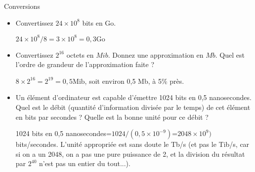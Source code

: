 \begin{exercice}
  \begin{exercicelet}{Conversions}
    \begin{itemize}
    \item Convertissez $24\times 10^8$ bits en $\mathrm{Go}$.
      \begin{correction} $24\times 10^8/8=3\times 10^8=0,3 \mathrm{Go}$
      \end{correction}
    \item Convertissez $2^{16}$ octets en $Mib$. Donnez une approximation en
      $Mb$. Quel est l'ordre de grandeur de l'approximation faite ?
      \begin{correction} $8\times2^{16}=2^{19}=0,5 \mathrm{Mib}$, soit
        environ 0,5 Mb, à 5\% près.
      \end{correction}
    \item Un élément d'ordinateur est capable d'émettre 1024 bits en 0,5
      nanosecondes. Quel est le débit (quantité d'information divisée par le
      temps) de cet élément en bits par secondes ? Quelle est la bonne unité
      pour ce débit ?
      \begin{correction} 1024 bits en 0,5
        nanosecondes=$1024/(0,5\times10^{-9})$=$2048\times10^{9})$
        bits/secondes. L'unité appropriée est sans doute le Tb/s (et pas le
        Tib/s, car si on a un 2048, on a pas une pure puissance de 2, et la
        division du résultat par $2^{40}$ n'est pas un entier du tout...).
      \end{correction}
    \end{itemize}
  \end{exercicelet}
\end{exercice}
